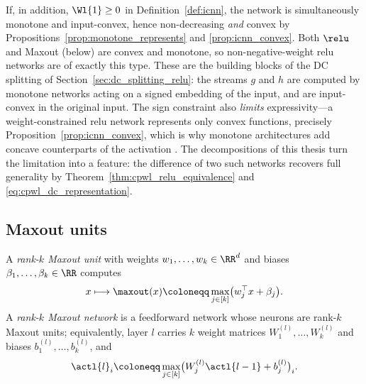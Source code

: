 \begin{remark}\label{rem:monotone_convex_combined}
If, in addition, $\Wl{1} \ge 0$ in Definition~\ref{def:icnn}, the network is simultaneously monotone and input-convex, hence non-decreasing \emph{and} convex by Propositions~\ref{prop:monotone_represents} and \ref{prop:icnn_convex}. Both $\relu$ and Maxout (below) are convex and monotone, so non-negative-weight \ac{relu} networks are of exactly this type. These are the building blocks of the DC splitting of Section~\ref{sec:dc_splitting_relu}: the streams $g$ and $h$ are computed by monotone networks acting on a signed embedding of the input, and are input-convex in the original input. The sign constraint also \emph{limits} expressivity---a weight-constrained \ac{relu} network represents only convex functions, precisely Proposition~\ref{prop:icnn_convex}, which is why monotone architectures add concave counterparts of the activation \parencite{Runje_2023}. The decompositions of this thesis turn the limitation into a feature: the difference of two such networks recovers full generality by Theorem~\ref{thm:cpwl_relu_equivalence} and \eqref{eq:cpwl_dc_representation}.
\end{remark}

\subsection*{Maxout units}

\begin{definition}\label{def:maxout}
A \emph{rank-$k$ Maxout unit} with weights $w_1, \ldots, w_k \in \RR^{d}$ and biases $\beta_1, \ldots, \beta_k \in \RR$ computes
\begin{equation}
	x \longmapsto \maxout(x) \coloneqq \max_{j \in [k]} \bigl( w_j^{\top} x + \beta_j \bigr).
	\label{eq:maxout_unit}
\end{equation}
A \emph{rank-$k$ Maxout network} is a feedforward network whose neurons are rank-$k$ Maxout units; equivalently, layer $l$ carries $k$ weight matrices $W^{(l)}_1, \ldots, W^{(l)}_k$ and biases $b^{(l)}_1, \ldots, b^{(l)}_k$, and
\begin{equation}
	\actl{l}_i \coloneqq \max_{j \in [k]} \bigl( W^{(l)}_j \actl{l-1} + b^{(l)}_j \bigr)_i .
	\label{eq:maxout_layer}
\end{equation}
\end{definition}

